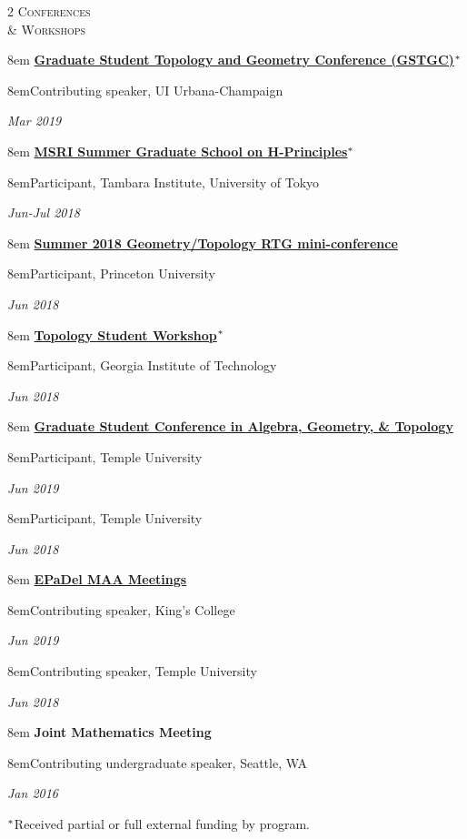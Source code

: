 \documentclass[11pt]{article}
\newcommand{\itemreg}[1]{\begin{addmargin}[0em]{8em} #1 \end{addmargin}}
\newcommand{\iteminddate}[2]{\begin{addmargin}[1.75em]{8em}#1\end{addmargin}\vspace{-1.15em}\hfill\textit{#2}\\}
\begin{document}
\begin{multicols}{2}
	\textsc{Conferences \\ \& Workshops}
	
	\columnbreak
	
	\itemreg{\textbf{\href{https://faculty.math.illinois.edu/~hquan4/GSTGC2019/index.html}{Graduate Student Topology and Geometry Conference (GSTGC)}}$\null^*$}
		\iteminddate{Contributing speaker, UI Urbana-Champaign}{Mar 2019}
		\vspace{.35em}
	
	\itemreg{\textbf{\href{http://www.msri.org/web/msri/scientific/workshops/summer-graduate-school}{MSRI Summer Graduate School on H-Principles}}$\null^*$}
		\iteminddate{Participant, Tambara Institute, University of Tokyo}{Jun-Jul 2018}
		\vspace{.35em}
		
	\itemreg{\textbf{\href{https://web.math.princeton.edu/~petero/RTG/MiniConf1.html}{Summer 2018 Geometry/Topology RTG mini-conference}}}
		\iteminddate{Participant, Princeton University}{Jun 2018}
		\vspace{.35em}
		
	\itemreg{\textbf{\href{http://people.math.gatech.edu/~dmargalit7/tsw18/index.shtml}{Topology Student Workshop}}$\null^*$}
		\iteminddate{Participant, Georgia Institute of Technology}{Jun 2018}
		\vspace{.35em}
		
	\itemreg{\textbf{\href{https://math.temple.edu/events/conferences/gscagt/}{Graduate Student Conference in Algebra, Geometry, \& Topology}}}
			\iteminddate{Participant, Temple University}{Jun 2019}
			\iteminddate{Participant, Temple University}{Jun 2018}
			\vspace{.35em}
			
	\itemreg{\textbf{\href{http://sections.maa.org/epadel/}{EPaDel MAA Meetings}}}
			\iteminddate{Contributing speaker, King's College}{Jun 2019}
			\iteminddate{Contributing speaker, Temple University}{Jun 2018}
			\vspace{.35em}
			
	\itemreg{\textbf{Joint Mathematics Meeting}}
			\iteminddate{Contributing undergraduate speaker, Seattle, WA}{Jan 2016}
			\vspace{.5em}
			
			\hspace{-0em}$\null^*${\footnotesize{Received partial or full external funding by program.}}
\end{multicols}
\vspace{-.5em}
\end{document}
